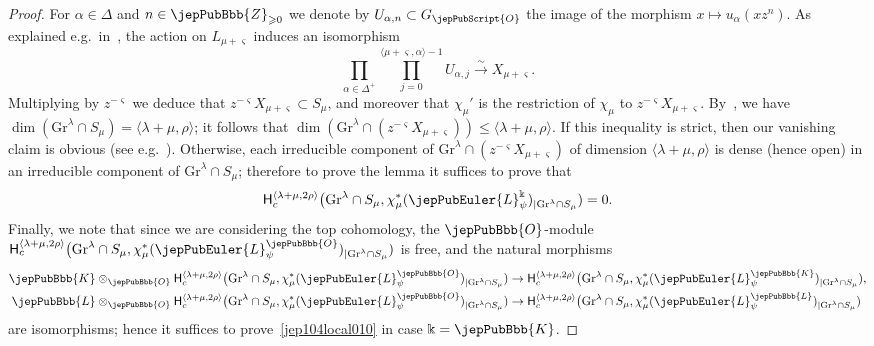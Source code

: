 \begin{proof}
For $\alpha \in \Delta$ and $n \in \jepPubBbb{Z}_{\geqslant 0}$ we denote by $U_{\alpha,n} \subset G_{\jepPubScript{O}}$ the image of the morphism $x \mapsto u_\alpha(xz^n)$.
As explained e.g.~in~\cite[Lem.~2.2]{jep104ref38}, the action on $L_{\mu+\varsigma}$ induces an isomorphism
\[
\prod_{\alpha \in \Delta^+} \prod_{j=0}^{\langle \mu+\varsigma, \alpha \rangle -1} U_{\alpha,j} \xrightarrow{\sim} X_{\mu + \varsigma}.
\]
Multiplying by $z^{-\varsigma}$ we deduce that $z^{-\varsigma} X_{\mu+\varsigma} \subset S_\mu$, and moreover that $\chi_\mu'$ is the restriction of $\chi_\mu$ to $z^{-\varsigma} X_{\mu+\varsigma}$. By~\cite[Th.~3.2]{jep104ref36}, we have $\dim(\mathrm{Gr}^\lambda \cap S_\mu)=\langle \lambda+\mu, \rho \rangle$; it follows that $\dim(\mathrm{Gr}^\lambda \cap (z^{-\varsigma} X_{\mu+\varsigma})) \leqslant \langle \lambda+\mu, \rho \rangle$. If this inequality is strict, then our vanishing claim is obvious (see e.g.~\cite[Th.~I.8.8]{jep104ref23}). Otherwise, each irreducible component of $\mathrm{Gr}^\lambda \cap (z^{-\varsigma} X_{\mu+\varsigma})$ of dimension $\langle \lambda+\mu, \rho \rangle$ is dense (hence open) in an irreducible component of $\mathrm{Gr}^\lambda \cap S_\mu$; therefore to prove the lemma it suffices to prove that
\begin{equation}
\label{jep104local010}
\mathsf{H}^{\langle \lambda+\mu,2\rho \rangle}_c \bigl( \mathrm{Gr}^\lambda \cap S_\mu, \chi_\mu^*(\jepPubEuler{L}^\Bbbk_\psi)_{|\mathrm{Gr}^\lambda \cap S_\mu}) = 0.
\end{equation}
Finally, we note that since we are considering the top cohomology, the $\jepPubBbb{O}$-module $\mathsf{H}^{\langle \lambda+\mu,2\rho \rangle}_c \bigl( \mathrm{Gr}^\lambda \cap S_\mu, \chi_\mu^*(\jepPubEuler{L}^{\jepPubBbb{O}}_\psi)_{|\mathrm{Gr}^\lambda \cap S_\mu})$ is free, and the natural morphisms
\begin{align*}
\jepPubBbb{K} \otimes_{\jepPubBbb{O}} \mathsf{H}^{\langle \lambda+\mu,2\rho \rangle}_c \bigl( \mathrm{Gr}^\lambda \cap S_\mu, \chi_\mu^*(\jepPubEuler{L}^{\jepPubBbb{O}}_\psi)_{|\mathrm{Gr}^\lambda \cap S_\mu}) &\to \mathsf{H}^{\langle \lambda+\mu,2\rho \rangle}_c \bigl( \mathrm{Gr}^\lambda \cap S_\mu, \chi_\mu^*(\jepPubEuler{L}^{\jepPubBbb{K}}_\psi)_{|\mathrm{Gr}^\lambda \cap S_\mu}), \\
\jepPubBbb{L} \otimes_{\jepPubBbb{O}} \mathsf{H}^{\langle \lambda+\mu,2\rho \rangle}_c \bigl( \mathrm{Gr}^\lambda \cap S_\mu, \chi_\mu^*(\jepPubEuler{L}^{\jepPubBbb{O}}_\psi)_{|\mathrm{Gr}^\lambda \cap S_\mu}) &\to \mathsf{H}^{\langle \lambda+\mu,2\rho \rangle}_c \bigl( \mathrm{Gr}^\lambda \cap S_\mu, \chi_\mu^*(\jepPubEuler{L}^{\jepPubBbb{L}}_\psi)_{|\mathrm{Gr}^\lambda \cap S_\mu})
\end{align*}
are isomorphisms; hence it suffices to prove~\eqref{jep104local010} in case $\Bbbk=\jepPubBbb{K}$.


\end{proof}
